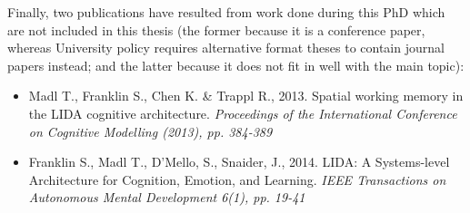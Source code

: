Finally, two publications have resulted from work done during this PhD which are not included in this thesis (the former because it is a conference paper, whereas University policy requires alternative format theses to contain journal papers instead; and the latter because it does not fit in well with the main topic):

\nocite{madl2013spatial, franklin2013lida}

\begin{itemize}
	\item Madl T., Franklin S., Chen K. \& Trappl R., 2013. Spatial working memory in the LIDA cognitive architecture. \textit{Proceedings of the International Conference on Cognitive Modelling (2013), pp. 384-389}
	\item Franklin S., Madl T., D'Mello, S., Snaider, J., 2014. LIDA: A Systems-level Architecture for Cognition, Emotion, and Learning. \textit{IEEE Transactions on Autonomous Mental Development 6(1), pp. 19-41}
\end{itemize}